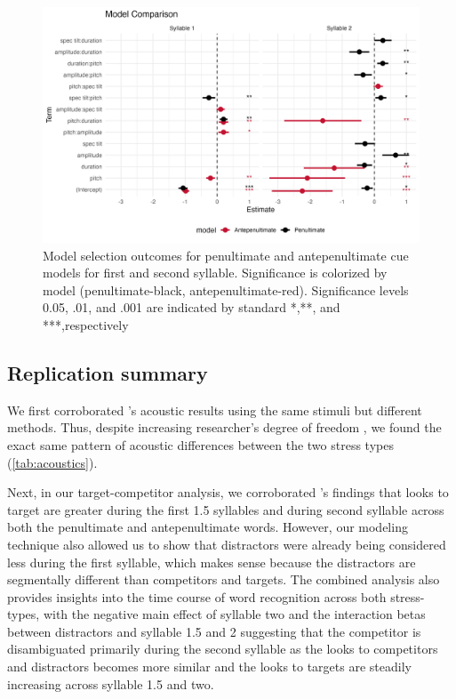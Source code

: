 \begin{figure}[H]
  \centering
  \includegraphics[width=1\linewidth]{visuals/analysis_3_plot.jpeg} %
  \caption{Model selection outcomes for penultimate and antepenultimate cue models for first and second syllable. Significance is colorized by model (penultimate-black, antepenultimate-red). Significance levels 0.05, .01, and .001 are indicated by standard *,**, and ***,respectively}
  \label{fig:analysis_3_plot }
\end{figure}

\subsection{Replication summary}
We first corroborated \cite{Sulpizio_McQueen_2012}'s acoustic results using the same stimuli but different methods. Thus, despite increasing researcher's degree of freedom \citep{Corretta2023}, we found the exact same pattern of acoustic differences between the two stress types (\ref{tab:acoustics}).

Next, in our target-competitor analysis, we corroborated \cite{Sulpizio_McQueen_2012}'s findings that looks to target are greater during the first 1.5 syllables and during second syllable across both the penultimate and antepenultimate words. However, our modeling technique also allowed us to show that distractors were already being considered less during the first syllable, which makes sense because the distractors are segmentally different than competitors and targets. The combined analysis also provides insights into the time course of word recognition across both stress-types, with the negative main effect of syllable two and the interaction betas between distractors and syllable 1.5 and 2 suggesting that the competitor is disambiguated primarily during the second syllable as the looks to competitors and distractors becomes more similar and the looks to targets are steadily increasing across syllable 1.5 and two.

